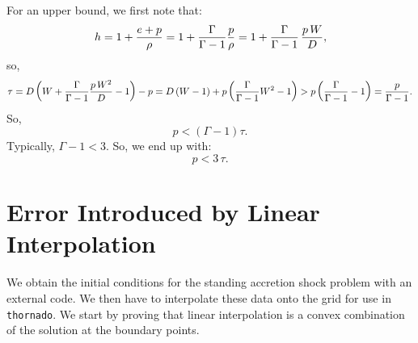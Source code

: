 \documentclass[10pt,preprint]{aastex}
\begin{document}
For an upper bound, we first note that:
\begin{equation}
h=1+\frac{e+p}{\rho}=1+\frac{\Gamma}{\Gamma-1}\frac{p}{\rho}=1+\frac{\Gamma}{\Gamma-1}\,\frac{p\,W}{D},
\end{equation}
so,
\begin{equation}
    \tau=D\left(W+\frac{\Gamma}{\Gamma-1}\frac{p\,W^{2}}{D}-1\right)-p=D\left(W-1\right)+p\left(\frac{\Gamma}{\Gamma-1}W^{2}-1\right)>p\left(\frac{\Gamma}{\Gamma-1}-1\right)=\frac{p}{\Gamma-1}.
\end{equation}
So,
\begin{equation}
    p<\left(\Gamma-1\right)\tau.
\end{equation}
Typically, $\Gamma-1<3$. So, we end up with:
\begin{equation}
    p<3\,\tau.
\end{equation}

\newpage

\section{Error Introduced by Linear Interpolation}
We obtain the initial conditions for the standing accretion shock problem with an external code. We then have to interpolate these data onto the grid for use in \texttt{thornado}. We start by proving that linear interpolation is a convex combination of the solution at the boundary points.
\end{document}
